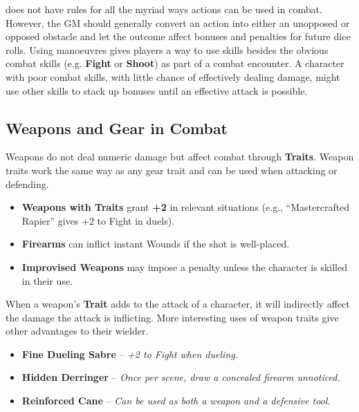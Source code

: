 \wyrd does not have rules for all the myriad ways actions can be used in combat. However, the GM should generally convert an action into either an unopposed or opposed obstacle and let the outcome affect bonuses and penalties for future dice rolls. Using manoeuvres gives players a way to use skills besides the obvious combat skills (e.g. \textbf{Fight} or \textbf{Shoot}) as part of a combat encounter. A character with poor combat skills, with little chance of effectively dealing damage, might use other skills to stack up bonuses until an effective attack is possible.

\subsection{Weapons and Gear in Combat}
Weapons do not deal numeric damage but affect combat through \textbf{Traits}. Weapon traits work the same way as any gear trait and can be used when attacking or defending.

\begin{WyrdExplanation}
	\begin{itemize}
    	\item \textbf{Weapons with Traits} grant \textbf{+2} in relevant situations (e.g., “Mastercrafted Rapier” gives +2 to Fight in duels).
	    \item \textbf{Firearms} can inflict instant Wounds if the shot is well-placed.
    	\item \textbf{Improvised Weapons} may impose a penalty unless the character is skilled in their use.
	\end{itemize}
\end{WyrdExplanation}

When a weapon's \textbf{Trait} adds to the attack of a character, it will indirectly affect the damage the attack is inflicting. More interesting uses of weapon traits give other advantages to their wielder.

\begin{WyrdExplanation}
	\begin{itemize}
    	\item \textbf{Fine Dueling Sabre} – \textit{+2 to Fight when dueling.}
	    \item \textbf{Hidden Derringer} – \textit{Once per scene, draw a concealed firearm unnoticed.}
	    \item \textbf{Reinforced Cane} – \textit{Can be used as both a weapon and a defensive tool.}
	\end{itemize}
\end{WyrdExplanation}

